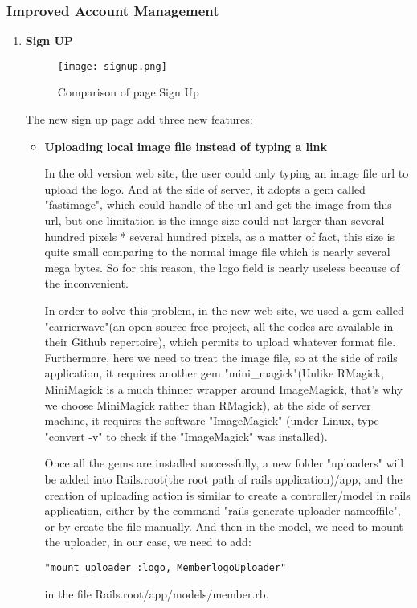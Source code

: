 \subsubsection{Improved Account Management}
\begin{enumerate}
\item{\textbf{Sign UP}}
\begin{figure}[h!]
\centering
\texttt{[image: signup.png]}
\caption{Comparison of page Sign Up }
\label{fig-sample}
\end{figure}

The new sign up page add three new features:
\begin{itemize}
\item{\textbf{Uploading local image file instead of typing a link}}


In the old version web site, the user could only typing an image file url to upload the logo. And at the side of server, it adopts a gem called "fastimage", which could handle of the url and get the image from this url, but one limitation is the image size could not larger than several hundred pixels * several hundred pixels, as a matter of fact, this size is quite small comparing to the normal image file which is nearly several mega bytes. So for this reason, the logo field is nearly useless because of the inconvenient. 


In order to solve this problem, in the new web site, we used a gem called "carrierwave"(an open source free project, all the codes are available in their Github repertoire), which permits to upload whatever format file. Furthermore, here we need to treat the image file, so at the side of rails application, it requires another gem "mini\_magick"(Unlike RMagick, MiniMagick is a much thinner wrapper around ImageMagick, that's why we choose MiniMagick rather than RMagick), at the side of server machine, it requires the software "ImageMagick" (under Linux, type "convert -v" to check if the "ImageMagick" was installed).


Once all the gems are installed successfully, a new folder "uploaders" will be added into Rails.root(the root path of rails application)/app, and the creation of uploading action is similar to create a controller/model in rails application, either by the command "rails generate uploader nameoffile", or by create the file manually. And then in the model, we need to mount the uploader, in our case, we need to add:  
\begin{lstlisting}
"mount_uploader :logo, MemberlogoUploader" 
\end{lstlisting}
in the file Rails.root/app/models/member.rb. 



\end{itemize}
\end{enumerate}
